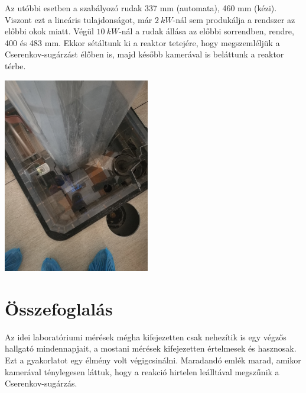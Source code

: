 \documentclass[a4paper,12pt]{article}
\begin{document}
\par Az utóbbi esetben a szabályozó rudak 337 mm (automata), 460 mm (kézi). Viszont ezt a lineáris tulajdonságot, már $2~kW$-nál sem produkálja a rendszer az előbbi okok miatt. Végül $10~kW$-nál a rudak állása az előbbi sorrendben, rendre, 400 és 483 mm. Ekkor sétáltunk ki a reaktor tetejére, hogy megszemléljük a Cserenkov-sugárzást élőben is, majd később kamerával is beláttunk a reaktor térbe.

\begin{center}
\includegraphics[width=0.48\textwidth]{../data/cherenkov.jpg}
\end{center}

\section{Összefoglalás}

\par Az idei laboratóriumi mérések mégha kifejezetten csak nehezítik is egy végzős hallgató mindennapjait, a mostani mérések kifejezetten értelmesek és hasznosak. Ezt a gyakorlatot egy élmény volt végigcsinálni. Maradandó emlék marad, amikor kamerával ténylegesen láttuk, hogy a reakció hirtelen leálltával megszűnik a Cserenkov-sugárzás.
\end{document}
